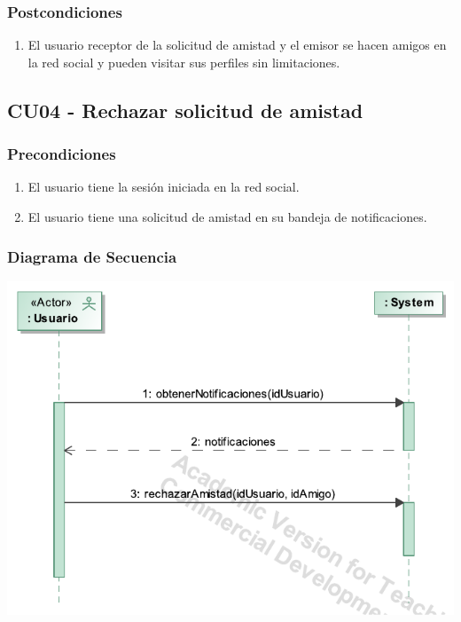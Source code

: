 \documentclass[12pt, a4paper, titlepage]{article}
\begin{document}
\subsubsection{Postcondiciones}
\begin{enumerate}
	\item El usuario receptor de la solicitud de amistad y el emisor se hacen amigos en la red social y pueden visitar sus perfiles sin limitaciones.
\end{enumerate}


\subsection{CU04 - Rechazar solicitud de amistad}

\subsubsection{Precondiciones}
\begin{enumerate}
	\item El usuario tiene la sesión iniciada en la red social.
	\item El usuario tiene una solicitud de amistad en su bandeja de notificaciones.
\end{enumerate}

\subsubsection{Diagrama de Secuencia}
\begin{center}
	\includegraphics[width=\textwidth]{Imagenes/Rechazar_solicitud_de_amistad}
\end{center}
\end{document}
